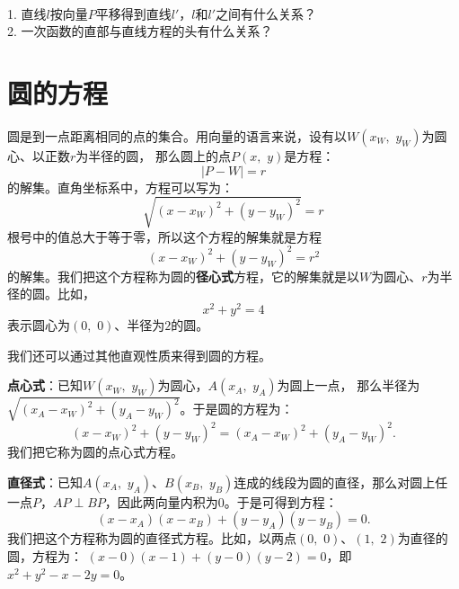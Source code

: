 \documentclass[12pt,UTF8,fontset=none]{ctexbook}
\begin{document}
\begin{sk}
    \mbox{}\\
    1. 直线$l$按向量$P$平移得到直线$l'$，$l$和$l'$之间有什么关系？ \\
    2. 一次函数的直部与直线方程的头有什么关系？
\end{sk}

\section{圆的方程}

圆是到一点距离相同的点的集合。用向量的语言来说，设有以$W(x_W,\,\, y_W)$为圆心、以正数$r$为半径的圆，
那么圆上的点$P(x, \,\,y)$是方程：
$$|P - W| = r$$
的解集。直角坐标系中，方程可以写为：
$$\sqrt{(x - x_W)^2 + (y - y_W)^2} = r$$
根号中的值总大于等于零，所以这个方程的解集就是方程
$$(x - x_W)^2 + (y - y_W)^2 = r^2$$
的解集。我们把这个方程称为圆的\textbf{径心式}方程，它的解集就是以$W$为圆心、$r$为半径的圆。比如，
$$x^2 + y^2 = 4$$
表示圆心为$(0,\,\,0)$、半径为$2$的圆。

我们还可以通过其他直观性质来得到圆的方程。

\textbf{点心式}：已知$W(x_W,\,\, y_W)$为圆心，$A(x_A,\,\,y_A)$为圆上一点，
那么半径为$\sqrt{(x_A - x_W)^2 + (y_A - y_W)^2}$。于是圆的方程为：
$$ (x - x_W)^2 + (y - y_W)^2 = (x_A - x_W)^2 + (y_A - y_W)^2.$$
我们把它称为圆的点心式方程。

\textbf{直径式}：已知$A(x_A,\,\,y_A)$、$B(x_B,\,\,y_B)$连成的线段为圆的直径，那么对圆上任一点$P$，$AP\perp BP$，因此两向量内积为$0$。于是可得到方程：
$$ (x - x_A)(x - x_B) + (y - y_A)(y - y_B) = 0.$$
我们把这个方程称为圆的直径式方程。比如，以两点$(0,\,\,0)$、$(1,\,\,2)$为直径的圆，方程为：
$ (x - 0)(x - 1) + (y - 0)(y - 2) = 0$，即$x^2 + y^2 - x - 2y = 0$。
\end{document}
